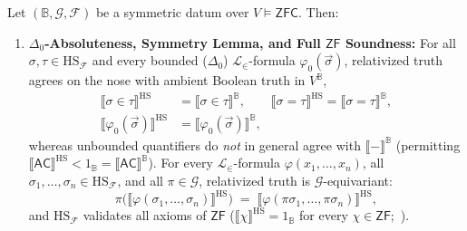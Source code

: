 \begin{theorem}\label{thm:symmetric-bv-zf}
%
Let $(\mathbb{B}, \mathcal{G}, \mathcal{F})$ be a symmetric datum over $V \models \mathsf{ZFC}$. Then:
\begin{enumerate}
  \item \textbf{$\Delta_0$-Absoluteness, Symmetry Lemma, and Full $\mathsf{ZF}$ Soundness:} For all $\sigma, \tau \in \mathrm{HS}_{\mathcal{F}}$ and every bounded ($\Delta_0$) $\mathcal{L}_\in$-formula $\varphi_0(\vec{\sigma})$, relativized truth agrees on the nose with ambient Boolean truth in $V^{\mathbb{B}}$,
  \[
    \begin{aligned}
      \llbracket \sigma \in \tau \rrbracket^{\mathrm{HS}} &= \llbracket \sigma \in \tau \rrbracket^{\mathbb{B}}, \qquad
      \llbracket \sigma = \tau \rrbracket^{\mathrm{HS}} = \llbracket \sigma = \tau \rrbracket^{\mathbb{B}}, \\
      \llbracket \varphi_0(\vec{\sigma}) \rrbracket^{\mathrm{HS}} &= \llbracket \varphi_0(\vec{\sigma}) \rrbracket^{\mathbb{B}},
    \end{aligned}
  \]
  whereas unbounded quantifiers do \emph{not} in general agree with $\llbracket - \rrbracket^{\mathbb{B}}$ (permitting $\llbracket \mathsf{AC} \rrbracket^{\mathrm{HS}} < 1_{\mathbb{B}} = \llbracket \mathsf{AC} \rrbracket^{\mathbb{B}}$). For every $\mathcal{L}_\in$-formula $\varphi(x_1, \dots, x_n)$, all $\sigma_1, \dots, \sigma_n \in \mathrm{HS}_{\mathcal{F}}$, and all $\pi \in \mathcal{G}$, relativized truth is $\mathcal{G}$-equivariant:
  \[
    \pi\bigl(\llbracket \varphi(\sigma_1, \dots, \sigma_n) \rrbracket^{\mathrm{HS}}\bigr) \;=\; \llbracket \varphi(\pi\sigma_1, \dots, \pi\sigma_n) \rrbracket^{\mathrm{HS}},
  \]
  and $\mathrm{HS}_{\mathcal{F}}$ validates all axioms of $\mathsf{ZF}$ ($\llbracket \chi \rrbracket^{\mathrm{HS}} = 1_{\mathbb{B}}$ for every $\chi \in \mathsf{ZF}$;~\cite[Thm.~5.14]{Jech73}).

\end{enumerate}
\end{theorem}
